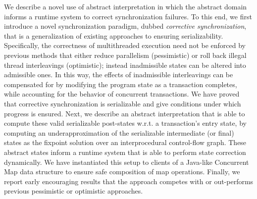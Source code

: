 We describe a novel use of abstract interpretation in which the
abstract domain informs a runtime system to correct synchronization
failures. To this end, we first introduce a novel synchronization paradigm,
dubbed \emph{corrective synchronization},
that is a generalization of existing approaches to ensuring serializability.
%
Specifically, the correctness of multithreaded execution need not be
enforced by previous methods that either reduce parallelism
(pessimistic) or roll back illegal thread interleavings (optimistic);
instead inadmissible states can be altered into admissible ones.
%
In this way, the effects of inadmissible interleavings can be
compensated for by modifying the program state as a transaction
completes, while accounting for the behavior of concurrent
transactions.
%
We have proved that corrective
synchronization is serializable and give conditions under which
progress is ensured. Next, we describe an abstract
interpretation that is able to compute these valid serializable
post-states w.r.t. a transaction's entry state, by computing
an underapproximation of the serializable intermediate (or final) states
as the fixpoint solution over an interprocedural control-flow graph.
%
These abstract states
inform a runtime system that is able to perform state correction
dynamically. We have instantiated this setup to clients of a Java-like
Concurrent Map data structure to ensure safe composition of map
operations. Finally, we report early encouraging results that the
approach competes with or out-performs previous pessimistic or
optimistic approaches.
